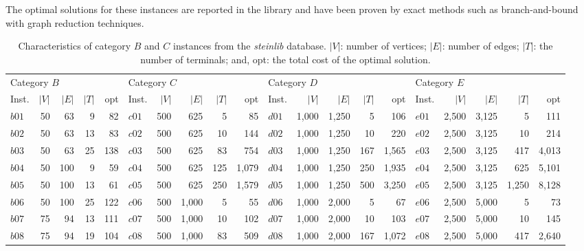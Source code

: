 \documentclass[authoryear,11pt,square,number,times,super,comma]{elsarticle}
\begin{document}
The optimal solutions for these instances are reported in the library and 
have been proven by exact methods such as branch-and-bound with graph reduction techniques.\par

\begin{table}[h]
\centering
\caption[Characteristics of category $B$, $C$, $D$ and $E$ instances from the \textit{steinlib} database]{Characteristics of category $B$ and $C$ instances from the \textit{steinlib} database. $|V|$: number of vertices; $|E|$: number of edges; $|T|$: the number of terminals; and,
         opt: the total cost of the optimal solution.}\label{tab:stpgprobs1}
\begin{adjustbox}{width=\textwidth}
\begin{tabular}{lrrrr|lrrrr|lrrrr|lrrrr} \toprule
\multicolumn{5}{l}{Category $B$} & \multicolumn{5}{l}{Category $C$}&\multicolumn{5}{l}{Category $D$} & \multicolumn{5}{l}{Category $E$}\\ 
\cmidrule(lr){1-5} \cmidrule(lr){6-10}\cmidrule(lr){11-15}\cmidrule(lr){16-20}
Inst.&$|V|$&$|E|$&$|T|$&opt& Inst.&$|V|$&$|E|$&$|T|$&opt&Inst.&$|V|$&$|E|$&$|T|$&opt& Inst.&$|V|$&$|E|$&$|T|$&opt\\ \hline
$b01$ & 50 & 63 & 9 & 82 & $c01$ & 500 & 625 & 5 & 85&  $d01$ & 1,000 & 1,250 & 5 & 106 & $e01$ & 2,500 & 3,125 & 5 & 111\\
$b02$ & 50 & 63 & 13 & 83& $c02$ & 500 & 625 & 10 & 144&  $d02$ & 1,000 & 1,250 & 10 & 220 & $e02$ & 2,500 & 3,125 & 10 & 214\\
$b03$ & 50 & 63 & 25 & 138& $c03$ & 500 & 625 & 83 & 754&  $d03$ & 1,000 & 1,250 & 167 & 1,565& $e03$ & 2,500 & 3,125 & 417 & 4,013\\
$b04$ & 50 & 100 & 9 & 59& $c04$ & 500 & 625 & 125 & 1,079&  $d04$ & 1,000 & 1,250 & 250 & 1,935& $e04$ & 2,500 & 3,125 & 625 & 5,101\\
$b05$ & 50 & 100 & 13 & 61& $c05$ & 500 & 625 & 250 & 1,579&  $d05$ & 1,000 & 1,250 & 500 & 3,250& $e05$ & 2,500 & 3,125 & 1,250 & 8,128\\
$b06$ & 50 & 100 & 25 & 122& $c06$ & 500 & 1,000 & 5 & 55&  $d06$ & 1,000 & 2,000 & 5 & 67& $e06$ & 2,500 & 5,000 & 5 & 73\\
$b07$ & 75 & 94 & 13 & 111& $c07$ & 500 & 1,000 & 10 & 102&  $d07$ & 1,000 & 2,000 & 10 & 103& $e07$ & 2,500 & 5,000 & 10 & 145\\
$b08$ & 75 & 94 & 19 & 104& $c08$ & 500 & 1,000 & 83 & 509&  $d08$ & 1,000 & 2,000 & 167 & 1,072& $e08$ & 2,500 & 5,000 & 417 & 2,640\\

\end{tabular}
\end{adjustbox}
\end{table}
\end{document}
